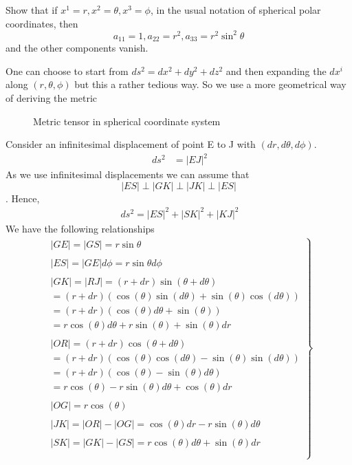 \begin{tcolorbox}
Show that if $x^1 = r, x^2 = \theta, x^3 = \phi$, in the usual notation of spherical polar coordinates, then $$ a_{11} =1, a_{22} = r^2, a_{33} = r^2\sin^2\theta$$ and the other components vanish.
\end{tcolorbox}
One can choose to start from $ds^2 = dx^2+dy^2+dz^2$ and then expanding the $dx^i$ along $(r,\theta,\phi)$ but this a rather tedious way. So we use a more geometrical way of deriving the metric\\
\begin{figure}[htp] 
    \centering

\caption{Metric tensor in spherical coordinate system}
\end{figure}
Consider an infinitesimal displacement of point E to J with $(dr,d\theta, d\phi )$.
\begin{align}
\ ds^2 &= |EJ|^2
\end{align}
As we use infinitesimal displacements we can assume that $$|ES|\perp|GK|\perp|JK|\perp|ES|$$. Hence,
\begin{align}
\ ds^2 = |ES|^2+|SK|^2+|KJ|^2
\end{align}
We have the following relationships
\begin{align}
\left.
\begin{array}{c}
\ |GE| = |GS| = r\sin\theta\\\\
\ |ES| = |GE|d\phi = r\sin\theta d\phi\\\\
\ |GK| = |RJ| = (r+dr)\sin(\theta+d\theta) \\
\ =(r+dr)(\cos(\theta)\sin(d\theta)+\sin(\theta)\cos(d\theta) )\\
\ = (r+dr)(\cos(\theta)d\theta+\sin(\theta))\\
\ = r\cos(\theta)d\theta+r\sin(\theta)+\sin(\theta)dr\\\\
\ |OR| =  (r+dr)\cos(\theta+d\theta)\\
\ = (r+dr)(\cos(\theta)\cos(d\theta)-\sin(\theta)\sin(d\theta))\\
\ = (r+dr)(\cos(\theta)-\sin(\theta)d\theta)\\
\ = r\cos(\theta)-r\sin(\theta)d\theta + \cos(\theta)dr\\\\
\ |OG| = r\cos(\theta)\\\\
\ |JK| = |OR|-|OG| = \cos(\theta)dr-r\sin(\theta)d\theta\\\\
\ |SK| = |GK|-|GS| = r\cos(\theta)d\theta+\sin(\theta)dr\\\\
\end{array}
\right\}
\end{align}
